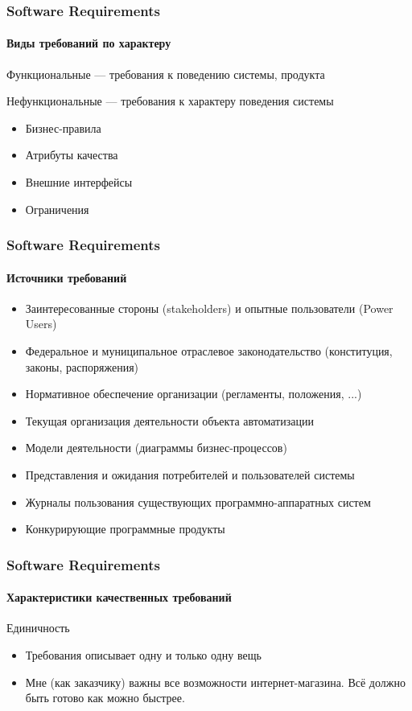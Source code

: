 \documentclass[aspectratio=169, 12pt]{beamer}
\begin{document}
\begin{frame}
    \frametitle{Software Requirements}
    \framesubtitle{Виды требований по характеру} \pause
    Функциональные --- требования к поведению системы, продукта \newline \pause

    Нефункциональные --- требования к характеру поведения системы \pause
    \begin{itemize}
        \item Бизнес-правила
        \item Атрибуты качества
        \item Внешние интерфейсы
        \item Ограничения
    \end{itemize}
\end{frame}

\begin{frame}[t]
    \frametitle{Software Requirements}
    \framesubtitle{Источники требований}
    \begin{itemize}
        \item Заинтересованные стороны (stakeholders) и опытные пользователи (Power Users) \pause
        \item Федеральное и муниципальное отраслевое законодательство
              (конституция, законы, распоряжения) \pause
        \item Нормативное обеспечение организации (регламенты, положения, ...) \pause
        \item Текущая организация деятельности объекта автоматизации \pause
        \item Модели деятельности (диаграммы бизнес-процессов) \pause
        \item Представления и ожидания потребителей и пользователей системы \pause
        \item Журналы пользования существующих программно-аппаратных систем \pause
        \item Конкурирующие программные продукты
    \end{itemize}
\end{frame}

\begin{frame}[t]
    \frametitle{Software Requirements}
    \framesubtitle{Характеристики качественных требований}
    Единичность \newline
    \begin{itemize}
        \item Требования описывает одну и только одну вещь \newline \pause
        \item Мне (как заказчику) важны все возможности интернет-магазина.
              Всё должно быть готово как можно быстрее.
    \end{itemize}
\end{frame}
\end{document}
